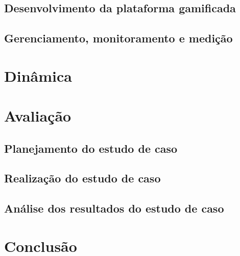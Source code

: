 \documentclass[
	12pt,
	openright,
	twoside,
	a4paper,
	english,
	brazil
	]{abntex2}
\begin{document}
\section{Desenvolvimento da plataforma gamificada}

\section{Gerenciamento, monitoramento e medição}


\chapter{Dinâmica}


\chapter{Avaliação}

\section{Planejamento do estudo de caso}
\section{Realização do estudo de caso}
\section{Análise dos resultados do estudo de caso}


\chapter{Conclusão}



\end{document}
